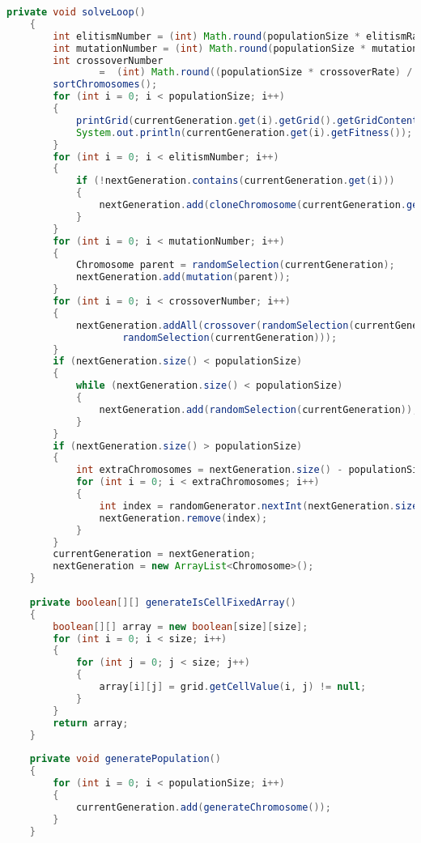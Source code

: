\begin{lstlisting}[language=Java,basicstyle=\tiny,caption=SolverGenetic.java]
    private void solveLoop()
    {      
        int elitismNumber = (int) Math.round(populationSize * elitismRate);
        int mutationNumber = (int) Math.round(populationSize * mutationRate);
        int crossoverNumber
                =  (int) Math.round((populationSize * crossoverRate) / 2);
        sortChromosomes();
        for (int i = 0; i < populationSize; i++)
        {
            printGrid(currentGeneration.get(i).getGrid().getGridContents());
            System.out.println(currentGeneration.get(i).getFitness());
        }
        for (int i = 0; i < elitismNumber; i++)
        {
            if (!nextGeneration.contains(currentGeneration.get(i)))
            {
                nextGeneration.add(cloneChromosome(currentGeneration.get(i)));
            }
        }
        for (int i = 0; i < mutationNumber; i++)
        {
            Chromosome parent = randomSelection(currentGeneration);
            nextGeneration.add(mutation(parent));
        }
        for (int i = 0; i < crossoverNumber; i++)
        {
            nextGeneration.addAll(crossover(randomSelection(currentGeneration),
                    randomSelection(currentGeneration)));
        }
        if (nextGeneration.size() < populationSize)
        {
            while (nextGeneration.size() < populationSize)
            {
                nextGeneration.add(randomSelection(currentGeneration));
            }
        }
        if (nextGeneration.size() > populationSize)
        {
            int extraChromosomes = nextGeneration.size() - populationSize;
            for (int i = 0; i < extraChromosomes; i++)
            {
                int index = randomGenerator.nextInt(nextGeneration.size());
                nextGeneration.remove(index);
            }
        }
        currentGeneration = nextGeneration;
        nextGeneration = new ArrayList<Chromosome>();
    }
    
    private boolean[][] generateIsCellFixedArray()
    {
        boolean[][] array = new boolean[size][size];
        for (int i = 0; i < size; i++)
        {
            for (int j = 0; j < size; j++)
            {
                array[i][j] = grid.getCellValue(i, j) != null;
            }
        }
        return array;
    }
    
    private void generatePopulation()
    {
        for (int i = 0; i < populationSize; i++)
        {
            currentGeneration.add(generateChromosome());
        }
    }
    

\end{lstlisting}
